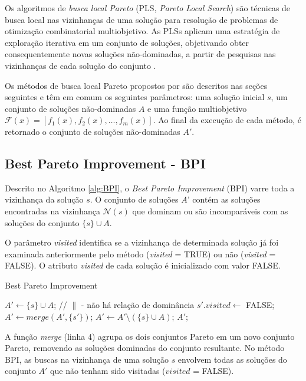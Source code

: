 \documentclass[
	12pt,				%
	openany,			%
	oneside,	
	a4paper,			%
	brazil,				%
	]{unimontes-ppgmsc-abntex2}
\begin{document}
Os algoritmos de {\em busca local Pareto} (PLS, {\em Pareto Local Search}) são técnicas de busca local nas vizinhanças de uma solução para resolução de problemas de otimização combinatorial multiobjetivo. As PLSs aplicam uma estratégia de exploração iterativa em um conjunto de soluções, objetivando obter consequentemente novas soluções não-dominadas, a partir de pesquisas nas vizinhanças de cada solução do conjunto \cite{Drugan_2012}. 

Os métodos de busca local Pareto propostos por   são descritos nas seções seguintes e têm em comum os seguintes parâmetros: uma solução inicial $s$, um conjunto de soluções não-dominadas $A$ e uma função multiobjetivo $\mathcal{F}(x)=[f_1(x), f_2(x), \dots, f_m(x)]$. Ao final da execução de cada método, é retornado o conjunto de soluções não-dominadas $A'$.

\subsection{Best Pareto Improvement - BPI} 

Descrito no Algoritmo \ref{alg:BPI}, o {\em Best Pareto Improvement} (BPI) varre toda a vizinhança da solução $s$. O conjunto de soluções $A’$ contém as soluções encontradas na vizinhança $\mathcal{N}(s)$ que dominam ou são incomparáveis com as soluções do conjunto $\{s\} \cup A$. 

O parâmetro {\em visited} identifica se a vizinhança de determinada solução já foi examinada anteriormente pelo método ({\em visited} = TRUE) ou não ({\em visited} = FALSE). O atributo {\em visited} de cada solução é inicializado com valor FALSE.

\begin{algorithm}[H]
\caption{Best Pareto Improvement}
\label{alg:BPI}
\begin{algorithmic}[1]
\State $A' \leftarrow \{s\} \cup A$;
   // $\parallel$ - \small{não há relação de dominância}
    \State $s'.visited \leftarrow$ FALSE;
    \State $A' \leftarrow merge(A', \{s'\})$;
  \EndIf
\EndFor
\State $A' \leftarrow A' \setminus (\{s\} \cup A)$;
\State \Return $A'$;
\end{algorithmic}
\end{algorithm}

A função {\em merge} (linha 4) agrupa os dois conjuntos Pareto em um novo conjunto Pareto, removendo as soluções dominadas do conjunto resultante. No método BPI, as buscas na vizinhança de uma solução $s$ envolvem todas as soluções do conjunto $A'$ que não tenham sido visitadas ($visited$ = FALSE).
\end{document}
